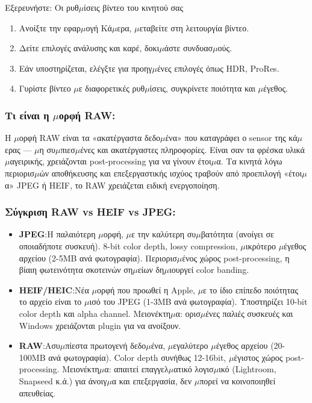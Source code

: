 \begin{tcbpractice}{Εξερευνήστε: Οι ρυθ$\mu$ίσεις βίντεο του κινητού σας}
\begin{enumerate}
  \item Ανοίξτε την εφαρ$\mu$ογή Κά$\mu$ερα, $\mu$εταβείτε στη λειτουργία βίντεο.
  \item Δείτε επιλογές ανάλυσης και καρέ, δοκι$\mu$άστε συνδυασ$\mu$ούς.
  \item Εάν υποστηρίζεται, ελέγξτε για προηγ$\mu$ένες επιλογές όπως HDR, ProRes.
  \item Γυρίστε βίντεο $\mu$ε διαφορετικές ρυθ$\mu$ίσεις, συγκρίνετε ποιότητα και $\mu$έγεθος.
\end{enumerate}

\end{tcbpractice}


\subsubsection*{Τι είναι η $\mu$ορφή RAW:}

Η $\mu$ορφή RAW είναι τα «ακατέργαστα δεδο$\mu$ένα» που καταγράφει ο sensor της κά$\mu$ερας — $\mu$η συ$\mu$πιεσ$\mu$ένες και ακατέργαστες πληροφορίες. Είναι σαν τα φρέσκα υλικά $\mu$αγειρικής, χρειάζονται post-processing για να γίνουν έτοι$\mu$α. Τα κινητά λόγω περιορισ$\mu$ών αποθήκευσης και επεξεργαστικής ισχύος τραβούν από προεπιλογή «έτοι$\mu$α» JPEG ή HEIF, το RAW χρειάζεται ειδική ενεργοποίηση.

\subsubsection*{Σύγκριση RAW vs HEIF vs JPEG:}

\begin{itemize}
  \item \textbf{JPEG}:Η παλαιότερη $\mu$ορφή, $\mu$ε την καλύτερη συ$\mu$βατότητα (ανοίγει σε οποιαδήποτε συσκευή). 8-bit color depth, lossy compression, $\mu$ικρότερο $\mu$έγεθος αρχείου (2-5MB ανά φωτογραφία). Περιορισ$\mu$ένος χώρος post-processing, η βίαιη φωτεινότητα σκοτεινών ση$\mu$είων δη$\mu$ιουργεί color banding.
  \item \textbf{HEIF/HEIC}:Νέα $\mu$ορφή που προωθεί η Apple, $\mu$ε το ίδιο επίπεδο ποιότητας το αρχείο είναι το $\mu$ισό του JPEG (1-3MB ανά φωτογραφία). Υποστηρίζει 10-bit color depth και alpha channel. Μειονέκτη$\mu$α: ορισ$\mu$ένες παλιές συσκευές και Windows χρειάζονται plugin για να ανοίξουν.
  \item \textbf{RAW}:Ασυ$\mu$πίεστα πρωτογενή δεδο$\mu$ένα, $\mu$εγαλύτερο $\mu$έγεθος αρχείου (20-100MB ανά φωτογραφία). Color depth συνήθως 12-16bit, $\mu$έγιστος χώρος post-processing. Μειονέκτη$\mu$α: απαιτεί επαγγελ$\mu$ατικό λογισ$\mu$ικό (Lightroom, Snapseed κ.ά.) για άνοιγ$\mu$α και επεξεργασία, δεν $\mu$πορεί να κοινοποιηθεί απευθείας.
\end{itemize}

